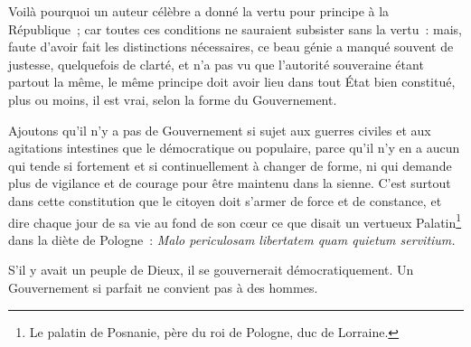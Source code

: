 \documentclass[french,twoside]{book} %
\begin{document}
Voilà pourquoi un auteur célèbre a donné la vertu pour principe à la République ; car toutes ces conditions ne sauraient subsister sans la vertu : mais, faute d’avoir fait les distinctions nécessaires, ce beau génie a manqué souvent de justesse, quelquefois de clarté, et n’a pas vu que l’autorité souveraine étant partout la même, le même principe doit avoir lieu dans tout État bien constitué, plus ou moins, il est vrai, selon la forme du Gouvernement.\par
Ajoutons qu’il n’y a pas de Gouvernement si sujet aux guerres civiles et aux agitations intestines que le démocratique ou populaire, parce qu’il n’y en a aucun qui tende si fortement et si continuellement à changer de forme, ni qui demande plus de vigilance et de courage pour être maintenu dans la sienne. C’est surtout dans cette constitution que le citoyen doit s’armer de force et de constance, et dire chaque jour de sa vie au fond de son cœur ce que disait un vertueux Palatin\footnote{Le palatin de Posnanie, père du roi de Pologne, duc de Lorraine.} dans la diète de Pologne : {\itshape Malo periculosam libertatem quam quietum servitium.}\par
S’il y avait un peuple de Dieux, il se gouvernerait démocratiquement. Un Gouvernement si parfait ne convient pas à des hommes.
\end{document}

